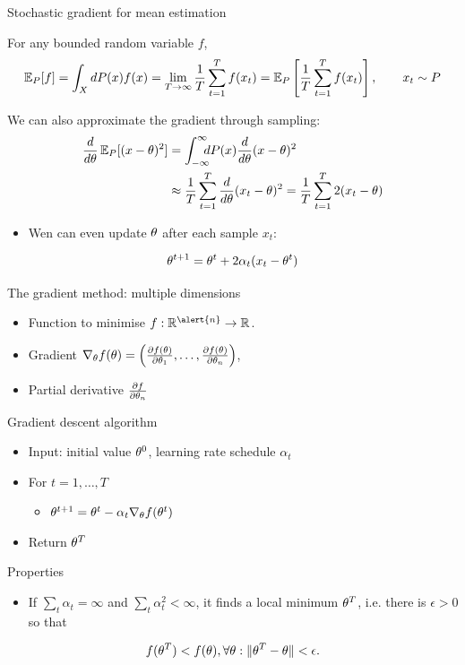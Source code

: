 \documentclass[smaller]{beamer}
\begin{document}
\begin{frame}[label={sec:orga768e87}]{Stochastic gradient for mean estimation}
\begin{theorem}[Sampling]
For any bounded random variable \(f\), 
\[
\mathop{\mbox{\ensuremath{\mathbb{E}}}}\nolimits_P[f] = \int_{X} dP(x) f(x)
 = 
\lim_{T \to \infty} \frac{1}{T} \sum_{t=1}^T f(x_t)
 = 
\mathop{\mbox{\ensuremath{\mathbb{E}}}}\nolimits_P \left[\frac{1}{T} \sum_{t=1}^T f(x_t)\right]
, \qquad x_t \sim P
\]
\end{theorem}
\begin{example}
We can also approximate the gradient through sampling:
\begin{align*}
 \frac{d}{d\theta} \mathop{\mbox{\ensuremath{\mathbb{E}}}}\nolimits_P [(x - \theta)^2] 
&= \int_{-\infty}^\infty \!\!\!\! dP(x) \frac{d}{d\theta} (x - \theta)^2
\\
&\approx \frac{1}{T} \sum_{t=1}^T \frac{d}{d\theta} (x_t - \theta)^2
= \frac{1}{T} \sum_{t=1}^T 2(x_t - \theta)
\end{align*}
\pause
\begin{itemize}
\item Wen can even update \(\theta\) after \alert{each sample} \(x_t\):
\end{itemize}
\[
\theta^{t+1} = \theta^t + 2 \alpha_t (x_t - \theta^t)
\]
\end{example}
\end{frame}
\begin{frame}[label={sec:org3d3175e}]{The gradient method: multiple dimensions}
\begin{itemize}
\item Function to minimise \(f : \Reals^{\alert{n}} \to \Reals\).
\item \alert{Gradient} \(\nabla_\theta f(\theta)  = \left(\frac{\partial f(\theta)}{\partial \theta_1}, \ldots, \frac{\partial f(\theta)}{\partial \theta_n}\right)\),
\item \alert{Partial} derivative \(\frac{\partial f}{\partial \theta_n}\)
\end{itemize}
\pause
\begin{block}{Gradient descent algorithm}
\begin{itemize}
\item Input: initial value \(\theta^0\), learning rate schedule \(\alpha_t\)
\item For \(t=1, \ldots, T\)
\begin{itemize}
\item \(\theta^{t+1} = \theta^t - \alpha_t \nabla_\theta f(\theta^t)\)
\end{itemize}
\item Return \(\theta^T\)
\end{itemize}
\pause
\end{block}
\begin{block}{Properties}
\begin{itemize}
\item If \(\sum_t \alpha_t = \infty\) and \(\sum_t \alpha_t^2 < \infty\), it finds a local minimum \(\theta^T\), i.e. there is \(\epsilon > 0\) so that
\end{itemize}
\[
f(\theta^T) < f(\theta), \forall \theta: \|\theta^T - \theta\| < \epsilon.
\]
\end{block}
\end{frame}
\end{document}
